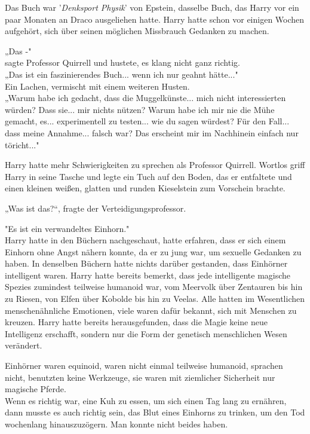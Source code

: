{Das Buch war '\emph{Denksport Physik}' von Epstein, dasselbe Buch, das Harry vor ein paar Monaten an Draco ausgeliehen hatte. Harry hatte schon vor einigen Wochen aufgehört, sich über seinen möglichen Missbrauch Gedanken zu machen.

„Das -"\\ sagte Professor Quirrell und hustete, es klang nicht ganz richtig.\\ „Das ist ein faszinierendes Buch... wenn ich nur geahnt hätte..."\\ Ein Lachen, vermischt mit einem weiteren Husten.\\ „Warum habe ich gedacht, dass die Muggelkünste... mich nicht interessierten würden? Dass sie... mir nichts nützen? Warum habe ich mir nie die Mühe gemacht, es... experimentell zu testen... wie du sagen würdest? Für den Fall... dass meine Annahme... falsch war? Das erscheint mir im Nachhinein einfach nur töricht..."

Harry hatte mehr Schwierigkeiten zu sprechen als Professor Quirrell. Wortlos griff Harry in seine Tasche und legte ein Tuch auf den Boden, das er entfaltete und einen kleinen weißen, glatten und runden Kieselstein zum Vorschein brachte.

„Was ist das?“, fragte der Verteidigungsprofessor.

"Es ist ein verwandeltes Einhorn."\\ Harry hatte in den Büchern nachgeschaut, hatte erfahren, dass er sich einem Einhorn ohne Angst nähern konnte, da er zu jung war, um sexuelle Gedanken zu haben. In denselben Büchern hatte nichts darüber gestanden, dass Einhörner intelligent waren. Harry hatte bereits bemerkt, dass jede intelligente magische Spezies zumindest teilweise humanoid war, vom Meervolk über Zentauren bis hin zu Riesen, von Elfen über Kobolde bis hin zu Veelas. Alle hatten im Wesentlichen menschenähnliche Emotionen, viele waren dafür bekannt, sich mit Menschen zu kreuzen. Harry hatte bereits herausgefunden, dass die Magie keine neue Intelligenz erschafft, sondern nur die Form der genetisch menschlichen Wesen verändert.

Einhörner waren equinoid, waren nicht einmal teilweise humanoid, sprachen nicht, benutzten keine Werkzeuge, sie waren mit ziemlicher Sicherheit nur magische Pferde.\\ Wenn es richtig war, eine Kuh zu essen, um sich einen Tag lang zu ernähren, dann musste es auch richtig sein, das Blut eines Einhorns zu trinken, um den Tod wochenlang hinauszuzögern. Man konnte nicht beides haben.

}
